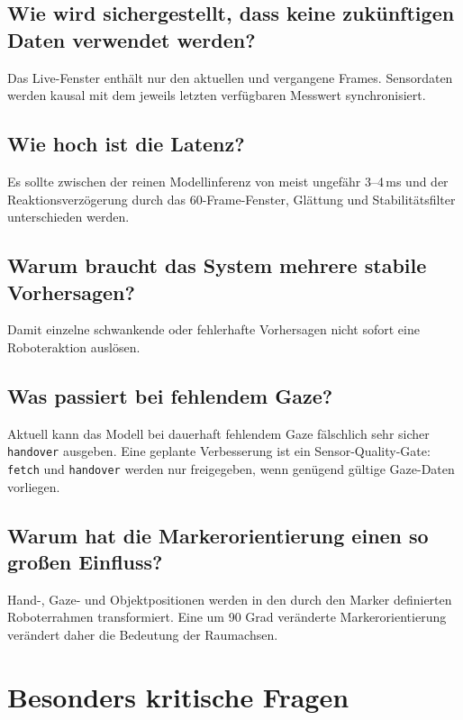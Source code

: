 \documentclass[11pt,a4paper]{article}
\begin{document}
\subsection*{Wie wird sichergestellt, dass keine zukünftigen Daten verwendet werden?}
Das Live-Fenster enthält nur den aktuellen und vergangene Frames. Sensordaten werden kausal mit dem jeweils letzten verfügbaren Messwert synchronisiert.

\subsection*{Wie hoch ist die Latenz?}
Es sollte zwischen der reinen Modellinferenz von meist ungefähr 3--4\,ms und der Reaktionsverzögerung durch das 60-Frame-Fenster, Glättung und Stabilitätsfilter unterschieden werden.

\subsection*{Warum braucht das System mehrere stabile Vorhersagen?}
Damit einzelne schwankende oder fehlerhafte Vorhersagen nicht sofort eine Roboteraktion auslösen.

\subsection*{Was passiert bei fehlendem Gaze?}
Aktuell kann das Modell bei dauerhaft fehlendem Gaze fälschlich sehr sicher \texttt{handover} ausgeben. Eine geplante Verbesserung ist ein Sensor-Quality-Gate: \texttt{fetch} und \texttt{handover} werden nur freigegeben, wenn genügend gültige Gaze-Daten vorliegen.

\subsection*{Warum hat die Markerorientierung einen so großen Einfluss?}
Hand-, Gaze- und Objektpositionen werden in den durch den Marker definierten Roboterrahmen transformiert. Eine um 90 Grad veränderte Markerorientierung verändert daher die Bedeutung der Raumachsen.

\section{Besonders kritische Fragen}
\end{document}
